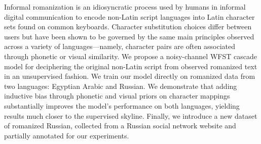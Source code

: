 Informal romanization is an idiosyncratic process used by humans in informal digital communication to encode non-Latin script languages into Latin character sets found on common keyboards. Character substitution choices differ between users but have been shown to be governed by the same main principles observed across a variety of languages---namely, character pairs are often associated through phonetic or visual similarity. We propose a noisy-channel WFST cascade model for deciphering the original non-Latin script from observed romanized text in an unsupervised fashion. We train our model directly on romanized data from two languages: Egyptian Arabic and Russian. We demonstrate that adding inductive bias through phonetic and visual priors on character mappings substantially improves the model's performance on both languages, yielding results much closer to the supervised skyline. Finally, we introduce a new dataset of romanized Russian, collected from a Russian social network website and partially annotated for our experiments.

